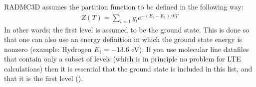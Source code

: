 \documentclass[letterpaper,10pt,english]{sphinxmanual}
\begin{document}
 RADMC\sphinxhyphen{}3D assumes the partition function to be defined in the following
way:
\begin{equation*}
\begin{split}Z(T) = \sum_{i=1} g_ie^{-(E_i-E_1)/kT}\end{split}
\end{equation*}
In other words: the first level is assumed to be the ground state. This is done
so that one can also use an energy definition in which the ground state energy
is non\sphinxhyphen{}zero (example: Hydrogen \(E_1=-13.6\) eV). If you use molecular line
datafiles that contain only a subset of levels (which is in principle no problem
for LTE calculations) then it is essential that the ground state is included in
this list, and that it is the first level ().
\end{document}
